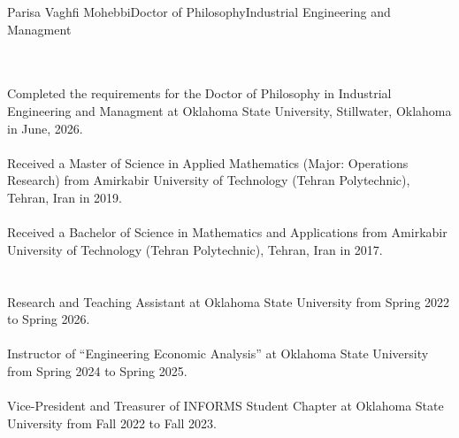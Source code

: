 \newpage
 \begin{vita}{Parisa Vaghfi Mohebbi}{Doctor of Philosophy}{Industrial Engineering and Managment} %

  \\
 \\
Completed the requirements for the Doctor of Philosophy in Industrial Engineering and Managment at Oklahoma State University, Stillwater,  Oklahoma in June, 2026.\\
\\
Received a Master of Science in Applied Mathematics (Major: Operations Research) from Amirkabir University of Technology (Tehran Polytechnic), Tehran,  Iran in 2019.\\
\\
Received a Bachelor of Science in Mathematics and Applications from Amirkabir University of Technology (Tehran Polytechnic), Tehran,  Iran in 2017.\\

  \\
 \\
 Research and Teaching Assistant at Oklahoma State University from
Spring 2022 to Spring 2026.\\
\\Instructor of “Engineering Economic Analysis” at Oklahoma State
University from Spring 2024 to Spring 2025.\\
\\Vice-President and Treasurer of INFORMS Student Chapter at Oklahoma State University from
Fall 2022 to Fall 2023.


 \end{vita}
